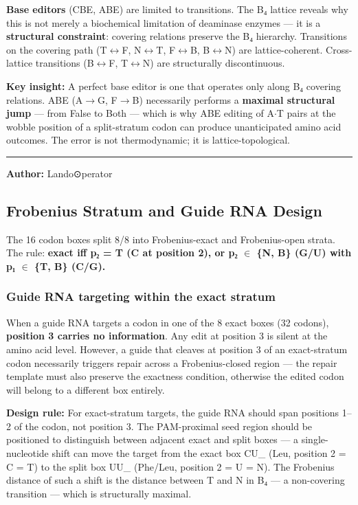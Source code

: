 \documentclass[12pt,a4paper]{article}
\begin{document}
\textbf{Base editors} (CBE, ABE) are limited to transitions. The B₄ lattice reveals why this is not merely a biochemical limitation of deaminase enzymes --- it is a \textbf{structural constraint}: covering relations preserve the B₄ hierarchy. Transitions on the covering path (T$\leftrightarrow$F, N$\leftrightarrow$T, F$\leftrightarrow$B, B$\leftrightarrow$N) are lattice-coherent. Cross-lattice transitions (B$\leftrightarrow$F, T$\leftrightarrow$N) are structurally discontinuous.

\textbf{Key insight:} A perfect base editor is one that operates only along B₄ covering relations. ABE (A$\rightarrow$G, F$\rightarrow$B) necessarily performs a \textbf{maximal structural jump} --- from False to Both --- which is why ABE editing of A$\cdot$T pairs at the wobble position of a split-stratum codon can produce unanticipated amino acid outcomes. The error is not thermodynamic; it is lattice-topological.

\begin{center}
\rule{0.5\textwidth}{0.4pt}
\end{center}

\textbf{Author:} Lando\otimes⊙perator

\subsection{Frobenius Stratum and Guide RNA Design}

The 16 codon boxes split 8/8 into Frobenius-exact and Frobenius-open strata. The rule: \textbf{exact iff p₂ = T (C at position 2), or p₂ $\in$ \{N, B\} (G/U) with p₁ $\in$ \{T, B\} (C/G).}

\subsubsection{Guide RNA targeting within the exact stratum}

When a guide RNA targets a codon in one of the 8 exact boxes (32 codons), \textbf{position 3 carries no information}. Any edit at position 3 is silent at the amino acid level. However, a guide that cleaves at position 3 of an exact-stratum codon necessarily triggers repair across a Frobenius-closed region --- the repair template must also preserve the exactness condition, otherwise the edited codon will belong to a different box entirely.

\textbf{Design rule:} For exact-stratum targets, the guide RNA should span positions 1--2 of the codon, not position 3. The PAM-proximal seed region should be positioned to distinguish between adjacent exact and split boxes --- a single-nucleotide shift can move the target from the exact box CU\_ (Leu, position 2 = C = T) to the split box UU\_ (Phe/Leu, position 2 = U = N). The Frobenius distance of such a shift is the distance between T and N in B₄ --- a non-covering transition --- which is structurally maximal.
\end{document}
